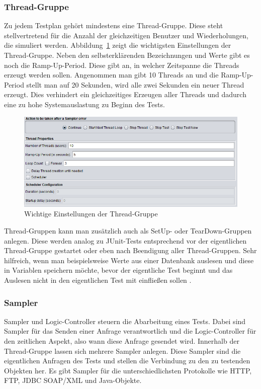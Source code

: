 \documentclass[a4paper,12pt]{article}
\begin{document}
\subsubsection{Thread-Gruppe}
Zu jedem Testplan gehört mindestens eine Thread-Gruppe. Diese steht stellvertretend für die Anzahl der gleichzeitigen Benutzer und Wiederholungen, die simuliert werden. Abbildung~\ref{fig:thread_group} zeigt die wichtigsten Einstellungen der Thread-Gruppe. Neben den selbsterklärenden Bezeichnungen und Werte gibt es noch die Ramp-Up-Period. Diese gibt an, in welcher Zeitspanne die Threads erzeugt werden sollen.
Angenommen man gibt 10 Threads an und die Ramp-Up-Period stellt man auf 20 Sekunden, wird alle zwei Sekunden ein neuer Thread erzeugt. Dies verhindert ein gleichzeitiges Erzeugen aller Threads und dadurch eine zu hohe Systemauslastung zu Beginn des Tests.

\begin{figure}[htb]%
 \centering
    \includegraphics[width=1\textwidth]{bilder/thread_group.png}
  \caption{Wichtige Einstellungen der Thread-Gruppe}
  \label{fig:thread_group}
\end{figure}

Thread-Gruppen kann man zusätzlich auch als SetUp- oder TearDown-Gruppen anlegen. Diese werden analog zu JUnit-Tests entsprechend vor der eigentlichen Thread-Gruppe gestartet oder eben nach Beendigung aller Thread-Gruppen. Sehr hilfreich, wenn man beispielsweise Werte aus einer Datenbank auslesen und diese in Variablen speichern möchte, bevor der eigentliche Test beginnt und das Auslesen nicht in den eigentlichen Test mit einfließen sollen \cite{online:testingJournals}.

\subsubsection{Sampler}
Sampler und Logic-Controller steuern die Abarbeitung eines Tests. Dabei sind Sampler für das Senden einer Anfrage verantwortlich und die Logic-Controller für den zeitlichen Aspekt, also wann diese Anfrage gesendet wird. Innerhalb der Thread-Gruppe lassen sich mehrere Sampler anlegen. Diese Sampler sind die eigentlichen Anfragen des Tests und stellen die Verbindung zu den zu testenden Objekten her. Es gibt Sampler für die unterschiedlichsten Protokolle wie HTTP, FTP, JDBC SOAP/XML und Java-Objekte. 
\end{document}
